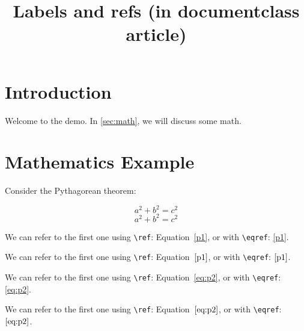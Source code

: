 \documentclass{article}
\title{Labels and refs (in documentclass article)}
\begin{document}
\maketitle

\section{Introduction}
\label{sec:intro}

Welcome to the demo. In \autoref{sec:math}, we will discuss some math.

\section{Mathematics Example}
\label{sec:math}

Consider the Pythagorean theorem:

\begin{equation}
    a^2 + b^2 = c^2 \label{p1}
\end{equation}
\begin{equation}
    a^2 + b^2 = c^2 \label{eq:p2}
\end{equation}


We can refer to the first one using \verb|\ref|: Equation~\ref{p1}, or with \verb|\eqref|: \eqref{p1}.

We can refer to the first one using \verb|\ref|: Equation~$\ref{p1}$, or with \verb|\eqref|: $\eqref{p1}$.

We can refer to the first one using \verb|\ref|: Equation~\ref{eq:p2}, or with \verb|\eqref|: \eqref{eq:p2}.

We can refer to the first one using \verb|\ref|: Equation~$\ref{eq:p2}$, or with \verb|\eqref|: $\eqref{eq:p2}$.

\lipsum[1]

\lipsum[12]

\lipsum[10]

\lipsum[10]
\lipsum[10]
\lipsum[10]
\lipsum[10]
\end{document}
